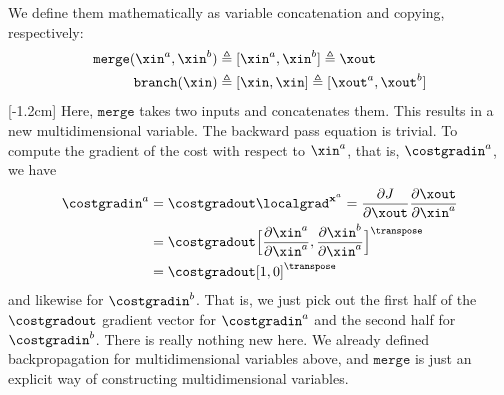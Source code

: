 We define them mathematically as variable concatenation and copying, respectively:
\begin{align}
    \texttt{merge}(\xin^a, \xin^b) &\triangleq [\xin^a, \xin^b] \triangleq \xout\\
    \texttt{branch}(\xin) &\triangleq [\xin, \xin] \triangleq [\xout^a, \xout^b]
\end{align}
[-1.2cm]
Here, $\texttt{merge}$ takes two inputs and concatenates them. This results in a new multidimensional variable. The backward pass equation is trivial. To compute the gradient of the cost with respect to $\xin^{a}$, that is, $\costgradin^a$, we have
\begin{align}
    \costgradin^{a} &= \costgradout \localgrad^{\mathbf{x}^a} = \frac{\partial J}{\partial \xout} \frac{\partial \xout}{\partial \xin^{a}}\\ %
    &= \costgradout \Big[\frac{\partial \xin^{a}}{\partial \xin^{a}}, \frac{\partial \xin^{b}}{\partial \xin^{a}}\Big]^\transpose\\
    &= \costgradout [1, 0]^\transpose
\end{align}
and likewise for $\costgradin^b$. That is, we just pick out the first half of the $\costgradout$ gradient vector for $\costgradin^a$ and the second half for $\costgradin^b$. There is really nothing new here. We already defined backpropagation for multidimensional variables above, and $\texttt{merge}$ is just an explicit way of constructing multidimensional variables.


